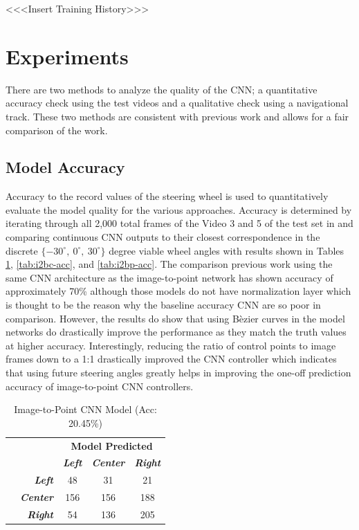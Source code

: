 \documentclass[conference]{IEEEtran}
\begin{document}
<<<Insert Training History>>>

\section{Experiments}

There are two methods to analyze the quality of the CNN; a quantitative accuracy check using the test videos and a qualitative check using a navigational track. These two methods are consistent with previous work \cite{bechtel2018} and allows for a fair comparison of the work.

\subsection{Model Accuracy}

Accuracy to the record values of the steering wheel is used to quantitatively evaluate the model quality for the various approaches. Accuracy is determined by iterating through all 2,000 total frames of the Video 3 and 5 of the test set in \cite{bechtel2018} and comparing continuous CNN outputs to their closest correspondence in the discrete $\lbrace -30^\circ,\ 0^\circ,\ 30^\circ\rbrace$ degree viable wheel angles with results shown in Tables \ref{tab:i2p-acc}, \ref{tab:i2bc-acc}, and \ref{tab:i2bp-acc}. The comparison previous work \cite{bechtel2018} using the same CNN architecture as the image-to-point network has shown accuracy of approximately 70\% although those models do not have normalization layer which is thought to be the reason why the baseline accuracy CNN are so poor in comparison. However, the results do show that using B\`ezier curves in the model networks do drastically improve the performance as they match the truth values at higher accuracy. Interestingly, reducing the ratio of control points to image frames down to a 1:1 drastically improved the CNN controller which indicates that using future steering angles greatly helps in improving the one-off prediction accuracy of image-to-point CNN controllers.


\begin{table}[btp]
	\centering
	\caption{Image-to-Point CNN Model (Acc: 20.45\%)}
	\begin{tabular}{|c|r|c|c|c|}
       \multicolumn{2}{c}{} & \multicolumn{3}{c}{\bfseries Model Predicted}\\\cline{3-5}
       \multicolumn{1}{c}{} & & \textbf{\textit{Left}} & \textbf{\textit{Center}} & \textbf{\textit{Right}}\\\hline
        \parbox[t]{2mm}{} & \textbf{\textit{Left}} & 48 & 31 & 21 \\
        & \textbf{\textit{Center}} & 156 & 156 & 188 \\
		& \textbf{\textit{Right}} & 54 & 136 & 205 \\\hline
	\end{tabular}
	\label{tab:i2p-acc}
\end{table}
    
\end{document}
